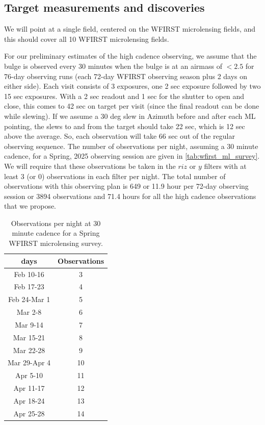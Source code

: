 


\subsection{Target measurements and discoveries}
\label{sec:\secname:targets}

We will point at a single field, centered on the WFIRST microlensing
fields, and this should cover all 10 WFIRST microlensing fields.

For our preliminary estimates of the high cadence observing, we assume
that the bulge is observed every 30 minutes when the bulge is at
an airmass of $< 2.5$ for 76-day observing runs (each 72-day WFIRST observing
season plus 2 days on either side). Each visit consists of 3 exposures,
one 2 sec exposure followed by two 15 sec exposures. With a 2 sec readout
and 1 sec for the shutter to open and close, this comes to 42 sec on target
per visit (since the final readout can be done while slewing).
If we assume a 30 deg slew in Azimuth before and after each ML pointing, the slews
to and from the target should take 22 sec, which is 12 sec above the average. So,
each observation will take 66 sec out of the regular observing sequence.
The number of observations per night, assuming a 30 minute cadence, for
a Spring, 2025 observing session are given in \autoref{tab:wfirst_ml_survey}. We will require
that these observations be taken in the $riz$ or $y$ filters with at
least 3 (or 0) observations in each filter per night. The total number
of observations with this observing plan is 649 or 11.9 hour per
72-day observing session or 3894 observations and 71.4 hours for
all the high cadence observations that we propose.

\begin{table}
\begin{tabular}{ c c }
{\bf days} & {\bf Observations} \\
\hline
Feb 10-16     &  3 \\
Feb 17-23     &  4 \\
Feb 24-Mar 1  &  5 \\
Mar 2-8       &  6 \\
Mar 9-14      &  7 \\
Mar 15-21     &  8 \\
Mar 22-28     &  9 \\
Mar 29-Apr 4  & 10 \\
Apr 5-10      & 11 \\
Apr 11-17     & 12 \\
Apr 18-24     & 13 \\
Apr 25-28     & 14 \\
\end{tabular}
\caption{Observations per night at 30 minute cadence for a Spring
WFIRST microlensing survey.}
\label{tab:wfirst_ml_survey}
\end{table}

